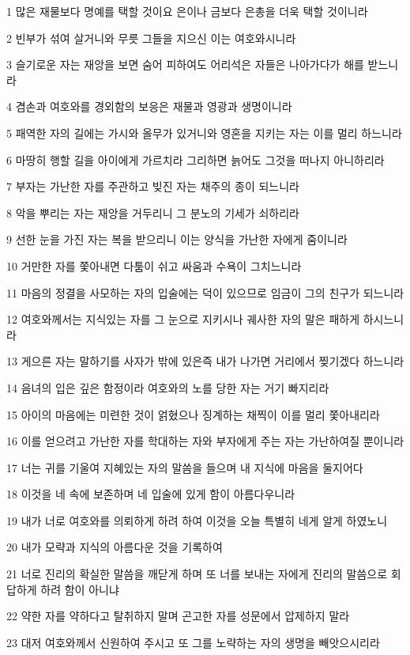\par 1 많은 재물보다 명예를 택할 것이요 은이나 금보다 은총을 더욱 택할 것이니라
\par 2 빈부가 섞여 살거니와 무릇 그들을 지으신 이는 여호와시니라
\par 3 슬기로운 자는 재앙을 보면 숨어 피하여도 어리석은 자들은 나아가다가 해를 받느니라
\par 4 겸손과 여호와를 경외함의 보응은 재물과 영광과 생명이니라
\par 5 패역한 자의 길에는 가시와 올무가 있거니와 영혼을 지키는 자는 이를 멀리 하느니라
\par 6 마땅히 행할 길을 아이에게 가르치라 그리하면 늙어도 그것을 떠나지 아니하리라
\par 7 부자는 가난한 자를 주관하고 빚진 자는 채주의 종이 되느니라
\par 8 악을 뿌리는 자는 재앙을 거두리니 그 분노의 기세가 쇠하리라
\par 9 선한 눈을 가진 자는 복을 받으리니 이는 양식을 가난한 자에게 줌이니라
\par 10 거만한 자를 쫓아내면 다툼이 쉬고 싸움과 수욕이 그치느니라
\par 11 마음의 정결을 사모하는 자의 입술에는 덕이 있으므로 임금이 그의 친구가 되느니라
\par 12 여호와께서는 지식있는 자를 그 눈으로 지키시나 궤사한 자의 말은 패하게 하시느니라
\par 13 게으른 자는 말하기를 사자가 밖에 있은즉 내가 나가면 거리에서 찢기겠다 하느니라
\par 14 음녀의 입은 깊은 함정이라 여호와의 노를 당한 자는 거기 빠지리라
\par 15 아이의 마음에는 미련한 것이 얽혔으나 징계하는 채찍이 이를 멀리 쫓아내리라
\par 16 이를 얻으려고 가난한 자를 학대하는 자와 부자에게 주는 자는 가난하여질 뿐이니라
\par 17 너는 귀를 기울여 지혜있는 자의 말씀을 들으며 내 지식에 마음을 둘지어다
\par 18 이것을 네 속에 보존하며 네 입술에 있게 함이 아름다우니라
\par 19 내가 너로 여호와를 의뢰하게 하려 하여 이것을 오늘 특별히 네게 알게 하였노니
\par 20 내가 모략과 지식의 아름다운 것을 기록하여
\par 21 너로 진리의 확실한 말씀을 깨닫게 하며 또 너를 보내는 자에게 진리의 말씀으로 회답하게 하려 함이 아니냐
\par 22 약한 자를 약하다고 탈취하지 말며 곤고한 자를 성문에서 압제하지 말라
\par 23 대저 여호와께서 신원하여 주시고 또 그를 노략하는 자의 생명을 빼앗으시리라
